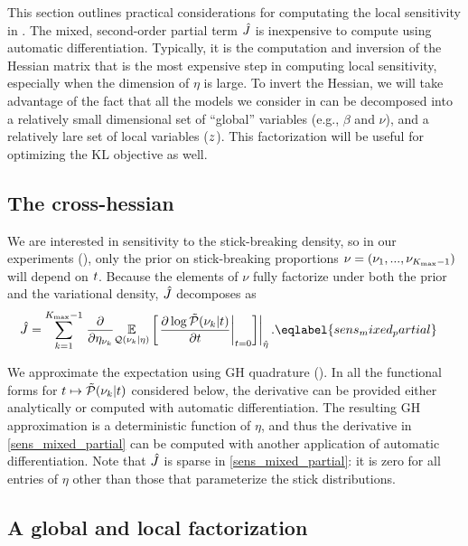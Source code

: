 
This section outlines practical considerations for computating the local
sensitivity in . The mixed, second-order partial term
$\hat J$ is inexpensive to compute using automatic differentiation.
Typically, it is the computation and inversion of the Hessian matrix that is the
most expensive step in computing local sensitivity, especially when the
dimension of $\eta$ is large. To invert the Hessian, we will take advantage of
the fact that all the models we consider in  can be decomposed
into a relatively small dimensional set of ``global'' variables (e.g., $\beta$
and $\nu$), and a relatively lare set of local variables ($z$). This
factorization will be useful for optimizing the $\mathrm{KL}$ objective as well.

\subsection{The cross-hessian}

We are interested in sensitivity to the stick-breaking density, so in our
experiments (), only the prior on stick-breaking proportions
$\nu = (\nu_1, ..., \nu_{{K_{\mathrm{max}}} - 1})$ will depend on $t$. Because the elements
of $\nu$ fully factorize under both the prior and the variational density,
$\hat J$ decomposes as
%
\begin{align}
  \crosshessian
  &= \sum_{\k=1}^{\kmax - 1}
         \evalat{\frac{\partial}{\partial \etanuk} \expect{\q(\nuk \vert \eta)}
                {
                \fracat{\partial \log \ptil(\nuk \vert \t)}{\partial \t}{\t = 0}
                }}{\etaopt}.
\eqlabel{sens_mixed_partial}
\end{align}

We approximate the expectation using GH quadrature (). In
all the functional forms for $t \mapsto \tilde{\mathcal{P}}(\nu_{k} \vert t)$ considered below,
the derivative can be provided either analytically or computed with automatic
differentiation.  The resulting GH approximation is a deterministic function of
$\eta$, and thus the derivative in \eqref{sens_mixed_partial} can be computed
with another application of automatic differentiation. Note that $\hat J$
is sparse in \eqref{sens_mixed_partial}: it is zero for all entries of $\eta$
other than those that parameterize the stick distributions.

\subsection{A global and local factorization}

